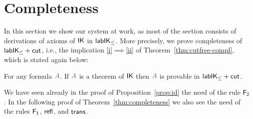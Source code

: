 
\section{Completeness}\label{sec:completeness}

In this section we show our system at work, as most of the section
consists of derivations of axioms of $\mathsf{IK}$ in $\mathsf{lab}\mathsf{IK}_{\le}$. More precisely, we prove completeness of $\mathsf{lab}\mathsf{IK}_{\le}+\mathsf{cut}$, i.e., the implication \ref{i}$\implies$\ref{ii} of Theorem~\ref{thm:cutfree-compl}, which is stated again below:

\begin{theorem}\label{thm:completeness}
	For any formula $\fm A$. If $\fm A$ is a theorem of $\mathsf{IK}$ then $\fm A$ is provable in $\mathsf{lab}\mathsf{IK}_{\le} +\mathsf{cut}_{}$.
\end{theorem}

\begin{remark}
  We have seen already in the proof of Proposition~\ref{prop:id} the
  need of the rule $\mathsf{F_2}$. In the following proof of
  Theorem~\ref{thm:completeness} we also see the need of the rules
  $\mathsf{F_1}$, $\mathsf{refl}$, and $\mathsf{trans}$.
\end{remark}

